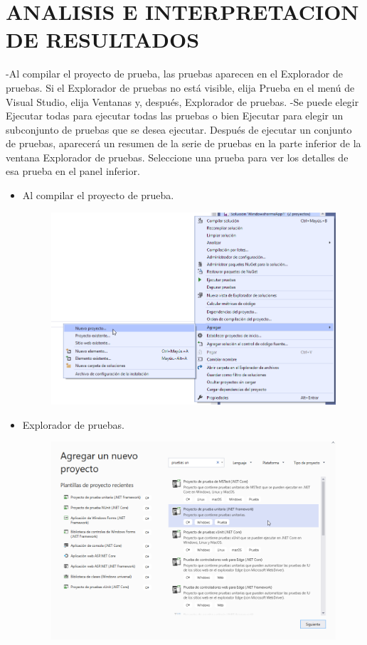 \section{ANALISIS E INTERPRETACION DE RESULTADOS} 
-Al compilar el proyecto de prueba, las pruebas aparecen en el Explorador de pruebas. Si el Explorador de pruebas no está visible, elija Prueba en el menú de Visual Studio, elija Ventanas y, después, Explorador de pruebas.
-Se puede elegir Ejecutar todas para ejecutar todas las pruebas o bien Ejecutar para elegir un subconjunto de pruebas que se desea ejecutar. Después de ejecutar un conjunto de pruebas, aparecerá un resumen de la serie de pruebas en la parte inferior de la ventana Explorador de pruebas. Seleccione una prueba para ver los detalles de esa prueba en el panel inferior. 
\begin{itemize}
	\item Al compilar el proyecto de prueba.
	\begin{figure}[htb]
\begin{center}
\includegraphics[width=12cm]{./Imagenes/imp1}
\end{center}
\end{figure}
	\item Explorador de pruebas.
\begin{figure}[htb]
\begin{center}
\includegraphics[width=12cm]{./Imagenes/imp2}
\end{center}
\end{figure}
\end{itemize}
